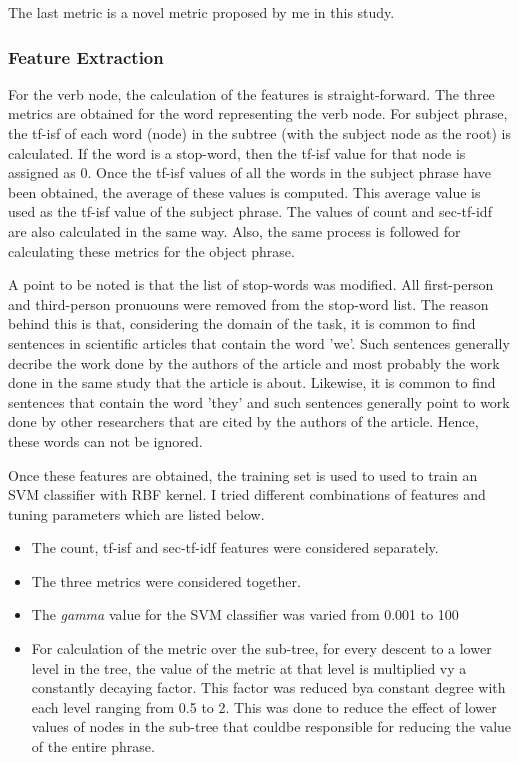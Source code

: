 The last metric is a novel metric proposed by me in this study.

\subsubsection*{Feature Extraction}
For the verb node, the calculation of the features is straight-forward.
The three metrics are obtained for the word representing the verb node.
For subject phrase, the tf-isf of each word (node) in the subtree (with the subject node as the root) is calculated.
If the word is a stop-word, then the tf-isf value for that node is assigned as 0.
Once the tf-isf values of all the words in the subject phrase have been obtained, the average of these values is computed.
This average value is used as the tf-isf value of the subject phrase.
The values of count and sec-tf-idf are also calculated in the same way.
Also, the same process is followed for calculating these metrics for the object phrase.

A point to be noted is that the list of stop-words was modified.
All first-person and third-person pronuouns were removed from the stop-word list.
The reason behind this is that, considering the domain of the task, it is common to find sentences in scientific articles that contain the word 'we'.
Such sentences generally decribe the work done by the authors of the article and most probably the work done in the same study that the article is about.
Likewise, it is common to find sentences that contain the word 'they' and such sentences generally point to work done by other researchers that are cited by the authors of the article.
Hence, these words can not be ignored.

Once these features are obtained, the training set is used to used to train an SVM classifier with RBF kernel.
I tried different combinations of features and tuning parameters which are listed below.
\begin{itemize}
\item The count, tf-isf and sec-tf-idf features were considered separately.
\item The three metrics were considered together.
\item The \textit{gamma} value for the SVM classifier was varied from 0.001 to 100
\item For calculation of the metric over the sub-tree, for every descent to a lower level in the tree, the value of the metric at that level is multiplied vy a constantly decaying factor.
This factor was reduced bya constant degree with each level ranging from 0.5 to 2.
This was done to reduce the effect of lower values of nodes in the sub-tree that couldbe responsible for reducing the value of the entire phrase.
\end{itemize}

